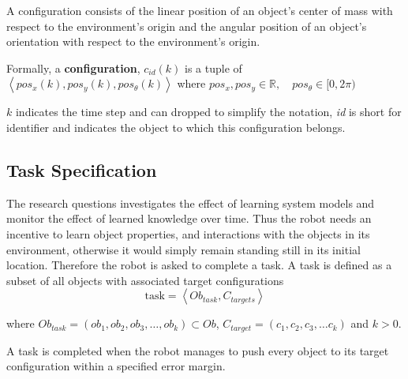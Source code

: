A configuration consists of the linear position of an object's center of mass with respect to the environment's origin and the angular position of an object's orientation with respect to the environment's origin.\bs

Formally, a \textbf{configuration}, $c_{id}(k)$ is a tuple of $\left\langle pos_x(k), pos_y(k), pos_\theta(k)\right\rangle$ \quad where $pos_x, pos_y \in \mathbb{R}, \quad  pos_\theta \in [0, 2\pi)$ 

$k$ indicates the time step and can dropped to simplify the notation, \textit{id} is short for identifier and indicates the object to which this configuration belongs.\\

\subsection{Task Specification}%
\label{subsec:task}
The research questions investigates the effect of learning system models and monitor the effect of learned knowledge over time. Thus the robot needs an incentive to learn object properties, and interactions with the objects in its environment, otherwise it would simply remain standing still in its initial location. Therefore the robot is asked to complete a task. A task is defined as a subset of all objects with associated target configurations\bs
\[\text{task} = \left\langle Ob_{task}, C_{targets} \right\rangle\]


where $Ob_{task} = (ob_1, ob_2, ob_3, \dots, ob_k) \subset Ob$, $C_{target} = (c_1, c_2, c_3, \dots c_k)$ and $k>0$.\bs

A task is completed when the robot manages to push every object to its target configuration within a specified error margin.

